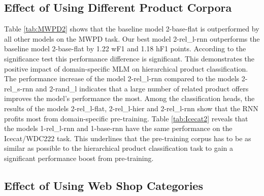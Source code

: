 \documentclass[11pt,dvipdfm]{article}
\begin{document}
\subsection{Effect of Using Different Product Corpora}

Table \ref{tab:MWPD2} shows that the baseline model 2-base-flat is outperformed by all other models on the \ac{MWPD} task.
Our best model 2-rel\_l-rnn outperforms the baseline model 2-base-flat by 1.22 \ac{wF1} and 1.18 \ac{hF1} points. 
According to the significance test this performance difference is significant.
This demonstrates the positive impact of domain-specific \ac{MLM} on hierarchical product classification.
The performance increase of the model 2-rel\_l-rnn compared to the models 2-rel\_s-rnn and 2-rand\_l indicates that a large number of related product offers improves the model's performance the most.
Among the classification heads, the results of the models 2-rel\_l-flat, 2-rel\_l-hier and 2-rel\_l-rnn show that the \ac{RNN} profits most from domain-specific pre-training.
Table \ref{tab:Icecat2} reveals that the models 1-rel\_l-rnn and 1-base-rnn have the same performance on the Icecat/WDC222 task.
This underlines that the pre-training corpus has to be as similar as possible to the hierarchical product classification task to gain a significant performance boost from pre-training.

\subsection{Effect of Using Web Shop Categories}
\end{document}
